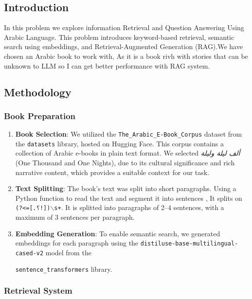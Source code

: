 \documentclass[12pt]{article}
\begin{document}
\subsection{Introduction}
In this problem we explore information Retrieval and Question Answering Using Arabic Language. This problem introduces  keyword-based retrieval, semantic search using embeddings, and Retrieval-Augmented Generation (RAG).We have chosen an Arabic book  \arabicfont {} to work with, As it is a book rivh with stories that can be unknown to LLM so I can get better performance with RAG system.

\subsection{Methodology}

\subsubsection{Book Preparation}



\begin{enumerate}
    \item \textbf{Book Selection}: We utilized the \texttt{The\_Arabic\_E-Book\_Corpus} dataset from the \texttt{datasets} library, hosted on Hugging Face. This corpus contains a collection of Arabic e-books in plain text format. We selected \textit{ألف ليلة وليلة} (One Thousand and One Nights), due to its cultural significance and rich narrative content, which provides a suitable context for our task.
    
    \item \textbf{Text Splitting}: The book’s text was split into short paragraphs. Using a Python function to read the text and segment it into sentences , It splits on \texttt{(?<=[.؟!])$\backslash$s+}. It is splitted into paragraphs of 2–4 sentences, with a maximum of 3 sentences per paragraph.
    
    \item \textbf{Embedding Generation}: To enable semantic search, we generated embeddings for each paragraph using the \texttt{distiluse-base-multilingual-cased-v2} model from 
    the
    
    \texttt{sentence\_transformers} library. 

    \end{enumerate}

\subsubsection{Retrieval System}
\end{document}
